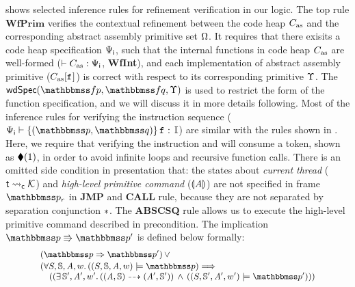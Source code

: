 \Fig{\ref{fig:Selected Inference Rules for Refinement Verification}} 
shows selected inference rules for refinement verification in our 
logic. The top rule $\textbf{WfPrim}$ verifies the contextual refinement 
between the code heap $C_{\text{as}}$ and the corresponding abstract assembly 
primitive set $\Omega$. It requires that 
there exisits a code heap specification $\Psi_{\textsf{i}}$, such that the 
internal functions in code heap $C_{\text{as}}$ are well-formed 
($\vdash {C_{\text{as}}} : {\Psi_{\textsf{i}}}$, \textbf{WfInt}), 
and each implementation of abstract 
assembly primitive ($C_{\text{as}}[\texttt{f}_{}]$) is correct with respect to 
its corresponding primitive $\Upsilon$. The 
$\wdSpec{\relspecpre}{\relspecpost}{\hprim}$ 
is used to restrict 
the form of the function specification,  
and we will discuss it in more details following. 
Most of the inference rules for verifying the instruction sequence 
($\wdcblk{\intSpec}{\relastP}{\relastQ}{\lab{}}{\cblk}$) are similar 
with the rules shown in \Fig{\ref{fig:Seleted Inference rules}}. 
Here, we require that verifying the instruction \jmp{} and \call{} 
will consume a token, shown as $\blacklozenge({1})$, in order to avoid 
infinite loops and recursive function calls. 
There is an omitted side condition in presentation that: 
the states about {\it current thread} 
(${\textsf{t}} \leadsto_{\textsf{c}} {\mathcal{K}}$)  
and {\it high-level primitive command} 
($\llparenthesis {\textit{A}} \rrparenthesis$) are not specified in frame 
$\relastP_r$ in \textbf{JMP} and \textbf{CALL} rule, 
because they are not separated by 
separation conjunction $*$.
The \textbf{ABSCSQ} rule allows us to execute the high-level 
primitive command described in precondition. 
The implication $\absExec{\relastP}{\relastP'}$ 
is defined below formally: 
\[
    \small
    \begin{array}{l}
        (\relastP \Rightarrow \relastP') \, \lor \\
        \\[-9.5pt]
        (
            \forall \state, \hpstate, \primcom, \word. \, 
            (\asrtmodel{(\state, \hpstate, \primcom, \word)}
                {\relastP}) \Longrightarrow \\
            \quad
            ((\exists \, \hpstate', \primcom', \word'. \, 
        (\primTrans{(\primcom, \hpstate)}
        	{(\primcom', \hpstate')})
        \, \land \, 
        (\asrtmodel{(\state, \hpstate', \primcom', \word')}{\relastP'})))
    \end{array}
\]
